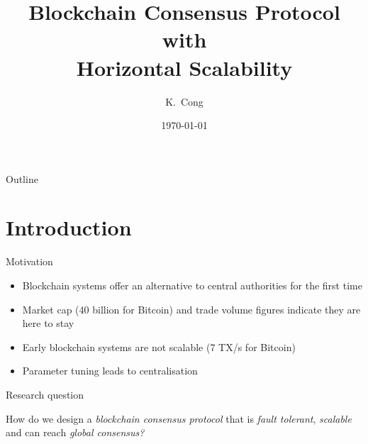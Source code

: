 \documentclass{beamer}
\title{Blockchain Consensus Protocol with\\Horizontal Scalability}
\author{K.~Cong}
\institute[Delft University of Technology] %
{
  Faculty of Electrical Engineering, Mathematics and Computer Science\\
  Delft University of Technology}
\date{\today}
\begin{document}
\begin{frame}
  \titlepage

\end{frame}

\begin{frame}{Outline}
  \tableofcontents
\end{frame}

\section{Introduction}
\begin{frame}{Motivation}
  \begin{itemize}
    \item Blockchain systems offer an alternative to central authorities for the first time
    \item Market cap (40 billion for Bitcoin) and trade volume figures indicate they are here to stay
    \item Early blockchain systems are not scalable (7 TX/s for Bitcoin)
    \item Parameter tuning leads to centralisation
  \end{itemize}
\end{frame}

\begin{frame}{Research question}
  \begin{block}{}
    How do we design a \emph{blockchain consensus protocol} that is \emph{fault tolerant},
    \emph{scalable} and can reach \emph{global consensus?}
  \end{block}
\end{frame}
\end{document}

